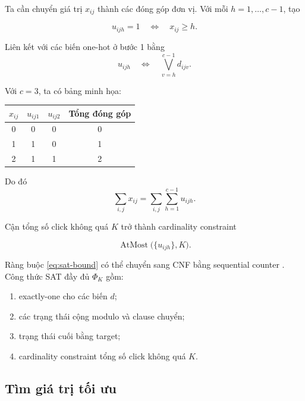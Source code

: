 \documentclass[11pt,a4paper]{article}
\newcommand{\AtMost}{\operatorname{AtMost}}
\begin{document}
Ta cần chuyển giá trị $x_{ij}$ thành các đóng góp đơn vị. Với mỗi
$h=1,\ldots,c-1$, tạo

\begin{equation}\label{eq:unit-literal}
  u_{ijh}=1
  \quad\Longleftrightarrow\quad
  x_{ij}\ge h.
\end{equation}

Liên kết với các biến one-hot ở bước 1 bằng
\begin{equation}\label{eq:unit-channel}
  u_{ijh}
  \quad\Longleftrightarrow\quad
  \bigvee_{v=h}^{c-1}d_{ijv}.
\end{equation}

Với $c=3$, ta có bảng minh họa:

\begin{center}
\begin{tabular}{c|cc|c}
\toprule
$x_{ij}$ & $u_{ij1}$ & $u_{ij2}$ & Tổng đóng góp\\
\midrule
0 & 0 & 0 & 0\\
1 & 1 & 0 & 1\\
2 & 1 & 1 & 2\\
\bottomrule
\end{tabular}
\end{center}

Do đó
\begin{equation}\label{eq:unit-sum}
  \sum_{i,j}x_{ij}
  =
  \sum_{i,j}\sum_{h=1}^{c-1}u_{ijh}.
\end{equation}

Cận tổng số click không quá $K$ trở thành cardinality constraint

\begin{equation}\label{eq:sat-bound}
  \AtMost\bigl(\{u_{ijh}\},K\bigr).
\end{equation}

Ràng buộc \cref{eq:sat-bound} có thể chuyển sang CNF bằng sequential
counter \cite{sinz2005towards}. Công thức SAT đầy đủ $\Phi_K$ gồm:

\begin{enumerate}
  \item exactly-one cho các biến $d$;
  \item các trạng thái cộng modulo và clause chuyển;
  \item trạng thái cuối bằng target;
  \item cardinality constraint tổng số click không quá $K$.
\end{enumerate}

\subsection{Tìm giá trị tối ưu}
\end{document}
